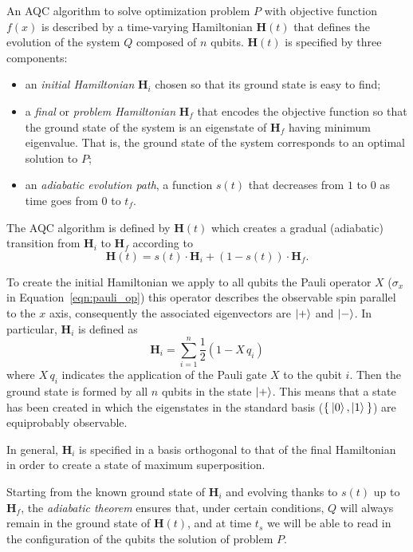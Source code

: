 An AQC algorithm to solve optimization problem $P$ with objective function $f(x)$ is described by a time-varying Hamiltonian $\mathbf{H}(t)$ that defines the evolution of the system $Q$ composed of $n$ qubits. $\mathbf{H}(t)$ is specified by three components:
\begin{itemize}
	\item an \emph{initial Hamiltonian} $\mathbf{H}_i$ chosen so that its ground state is easy to find;
	\item a \emph{final} or \emph{problem Hamiltonian} $\mathbf{H}_f$ that encodes the objective function so that the
	ground state of the system is an eigenstate of $\mathbf{H}_f$ having minimum eigenvalue. That is, the ground
	state of the system corresponds to an optimal solution to $P$;
	\item an\emph{ adiabatic evolution path}, a function $s(t)$ that decreases from $1$ to $0$ as time goes from $0$ to $t_f$.
\end{itemize}
The AQC algorithm is defined by $\mathbf{H}(t)$ which creates a gradual (adiabatic) transition from $\mathbf{H}_i$ to $\mathbf{H}_f$ according to
\begin{equation}
	\mathbf{H}(t) = s(t) \cdot \mathbf{H}_i +(1-s(t)) \cdot \mathbf{H}_f.
\end{equation}

To create the initial Hamiltonian we apply to all qubits the Pauli operator $X$ ($\sigma_x$ in Equation~\ref{eqn:pauli_op}) \textemdash{}this operator describes the observable spin parallel to the $x$ axis, consequently\textemdash{} the associated eigenvectors are $\Ket{+}$ and $\Ket{-}$. In particular, $\mathbf{H}_i$ is defined as
\[
\mathbf{H}_i = \sum_{i = 1}^{n} \frac{1}{2} (1 - X\,q_i)
\]
where $X\,q_i$ indicates the application of the Pauli gate $X$ to the qubit $i$. Then the ground state is formed by all $n$ qubits in the state $\Ket{+}$. This means that a state has been created in which the eigenstates in the standard basis ($\Set{\Ket{0}, \Ket{1}}$) are equiprobably observable.

In general, $\mathbf{H}_i$ is specified in a basis orthogonal to that of the final Hamiltonian in order to create a state of maximum superposition.

Starting from the known ground state of $\mathbf{H}_i$ and evolving thanks to $s(t)$ up to $\mathbf{H}_f$, the \emph{adiabatic theorem} ensures that, under certain conditions, $Q$ will always remain in the ground state of $\mathbf{H}(t)$, and at time $t_s$ we will be able to read in the configuration of the qubits the solution of problem $P$.

